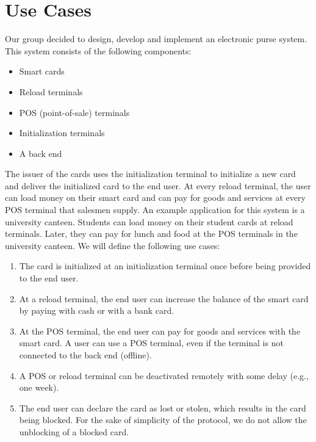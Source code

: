 \documentclass{article}
\begin{document}
\maketitle



\section{Use Cases}
Our group decided to design, develop and implement an electronic purse system.
This system consists of the following components:
\begin{itemize}
    \item Smart cards
    \item Reload terminals
    \item POS (point-of-sale) terminals
    \item Initialization terminals
    \item A back end
\end{itemize}
The issuer of the cards uses the initialization terminal to initialize a new card and deliver the initialized card to the end user.
At every reload terminal, the user can load money on their smart card and can pay for goods and services at every POS terminal that salesmen supply.
An example application for this system is a university canteen.
Students can load money on their student cards at reload terminals.
Later, they can pay for lunch and food at the POS terminals in the university canteen.
We will define the following use cases:
\begin{enumerate}[label={UC\arabic*:}, ref={UC\arabic*}, leftmargin=3\parindent]
    \item \label{uc:person} The card is initialized at an initialization terminal once before being provided to the end user.
    
    \item \label{uc:reload} At a reload terminal, the end user can increase the balance of the smart card by paying with cash or with a bank card.
    
    \item \label{uc:payment} At the POS terminal, the end user can pay for goods and services with the smart card.
    A user can use a POS terminal, even if the terminal is not connected to the back end (offline).

    \item A POS or reload terminal can be deactivated remotely with some delay (e.g., one week).
    
    \item The end user can declare the card as lost or stolen, which results in the card being blocked.
    For the sake of simplicity of the protocol, we do not allow the unblocking of a blocked card.
    
\end{enumerate}
\end{document}
